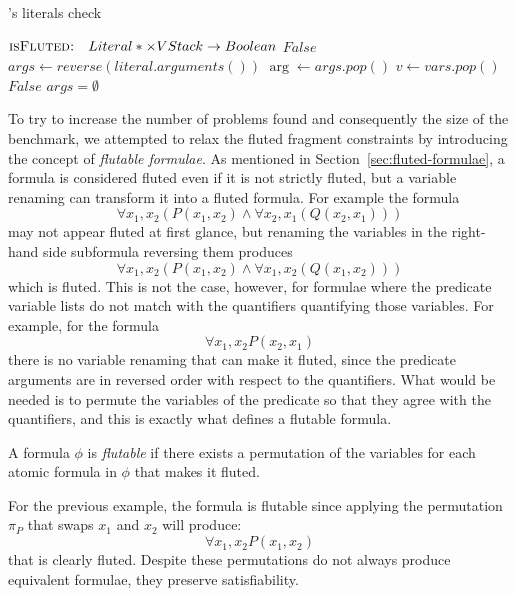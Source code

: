 \begin{algorithm}
  \caption{'s literals check}\label{alg:formula-classifier-literals}
  \begin{algorithmic}[1]
      \Statex{}  \(\textsc{isFluted:} \quad Literal* \times VStack\to Boolean\)
            \State{} \Return{} \(False\)
          \EndIf{}
          \State{} \(args \gets reverse(literal.arguments())\)
              \State{} \(\arg \gets args.pop()\)
              \State{} \(v \gets vars.pop()\)
                  \State{} \Return{} \(False\)
              \EndIf{}
          \EndWhile{}
          \State{} \Return{} \(args = \emptyset\)
      \EndFunction{}
  \end{algorithmic}
\end{algorithm}

To try to increase the number of problems found and consequently the size of the benchmark, we attempted to relax the fluted fragment constraints by introducing the concept of \emph{flutable formulae}.
As mentioned in Section~\ref{sec:fluted-formulae}, a formula is considered fluted even if it is not strictly fluted, but a variable renaming can transform it into a fluted formula.
For example the formula
\[
  \forall x_1,x_2 (P(x_1,x_2) \land \forall x_2,x_1 (Q(x_2,x_1)))
\]
may not appear fluted at first glance, but renaming the variables in the right-hand side subformula reversing them produces
\[
  \forall x_1,x_2 (P(x_1,x_2) \land \forall x_1,x_2 (Q(x_1,x_2)))
\]
which is fluted.
This is not the case, however, for formulae where the predicate variable lists do not match with the quantifiers quantifying those variables.
For example, for the formula
\[
  \forall x_1,x_2 P(x_2,x_1) 
\]
there is no variable renaming that can make it fluted, since the predicate arguments are in reversed order with respect to the quantifiers.
What would be needed is to permute the variables of the predicate so that they agree with the quantifiers, and this is exactly what defines a flutable formula.
\begin{definition}\label{def:flutable-formulae}
  A formula \(\phi\) is \emph{flutable} if there exists a permutation of the variables for each atomic formula in \(\phi\) that makes it fluted.
\end{definition}
For the previous example, the formula is flutable since applying the permutation \(\pi_P\) that swaps \(x_1\) and \(x_2\) will produce:
\[
  \forall x_1,x_2 P(x_1,x_2) 
\]
that is clearly fluted.
Despite these permutations do not always produce equivalent formulae, they preserve satisfiability.


